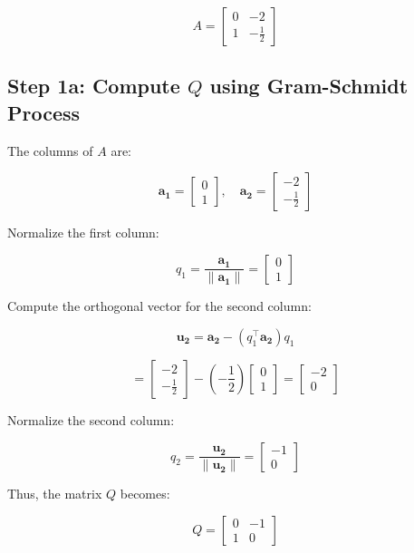 \documentclass[journal]{IEEEtran}
\begin{document}
\[
A = \begin{bmatrix}
0 & -2 \\
1 & -\frac{1}{2}
\end{bmatrix}
\]

\subsection*{Step 1a: Compute $Q$ using Gram-Schmidt Process}
The columns of $A$ are:

\[
\mathbf{a_1} = \begin{bmatrix}
0 \\
1
\end{bmatrix}, \quad
\mathbf{a_2} = \begin{bmatrix}
-2 \\
-\frac{1}{2}
\end{bmatrix}
\]

Normalize the first column:

\[
q_1 = \frac{\mathbf{a_1}}{\|\mathbf{a_1}\|} = 
\begin{bmatrix}
0 \\
1
\end{bmatrix}
\]

Compute the orthogonal vector for the second column:

\[
\mathbf{u_2} = \mathbf{a_2} - (q_1^\top \mathbf{a_2})q_1
\]

\[
= \begin{bmatrix}
-2 \\
-\frac{1}{2}
\end{bmatrix}
- \left( -\frac{1}{2} \right) \begin{bmatrix}
0 \\
1
\end{bmatrix}
= \begin{bmatrix}
-2 \\
0
\end{bmatrix}
\]

Normalize the second column:

\[
q_2 = \frac{\mathbf{u_2}}{\|\mathbf{u_2}\|} = 
\begin{bmatrix}
-1 \\
0
\end{bmatrix}
\]

Thus, the matrix $Q$ becomes:

\[
Q = \begin{bmatrix}
0 & -1 \\
1 & 0
\end{bmatrix}
\]
\end{document}
